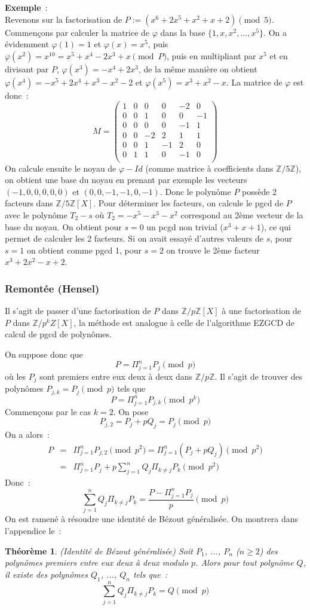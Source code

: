 \documentclass[a4paper,11pt]{article}
\newtheorem{thm}{Théorème}
\newcommand{\Z}{{\mathbb{Z}}}
\begin{document}
\begin{giacjshere}
{\bf Exemple}~:\\
Revenons sur la factorisation de $P:=(x^6+2x^5+x^2+x+2) \pmod 5$.
Commençons par calculer la matrice de $\varphi$ dans la base
$\{ 1,x,x^2,...,x^5\}$. On a évidemment $\varphi(1)=1$ et
$\varphi(x)=x^5$, puis $\varphi(x^2)=x^{10}=x^5+x^4-2x^3+x \pmod P$,
puis en multipliant par $x^5$ et en divisant par $P$,
$\varphi(x^3)=-x^4+2x^3$, de la même manière on obtient 
$\varphi(x^4)=-x^5+2x^4+x^3-x^2-2$ et $\varphi(x^5)=x^3+x^2-x$.
La matrice de $\varphi$ est donc~:
\[ M=\left( 
\begin{array}{cccccc}
1& 0& 0 &0 &-2&0\\
0& 0& 1 &0 &0 &-1\\
0& 0& 0 &0 &-1&1\\
0& 0& -2&2 & 1&1\\
0& 0& 1 &-1& 2&0\\
0& 1& 1 &0 &-1&0\\
\end{array}
\right)\]
On calcule ensuite le noyau de $\varphi-Id$ (comme matrice à coefficients
dans $\Z/5\Z$), on obtient une
base du noyau en prenant par exemple les vecteurs $(-1,0,0,0,0,0)$
et $(0,0,-1,-1,0,-1)$. Donc le polynôme $P$ possède 2 facteurs dans
$\Z/5\Z[X]$. Pour déterminer les facteurs, on calcule le pgcd de $P$
avec le polynôme $T_2-s$ où $T_2=-x^5-x^3-x^2$ correspond au 2ème
vecteur de la base du noyau. On obtient pour $s=0$ un pcgd non trivial
($x^3+x+1$), ce qui permet de calculer les 2 facteurs. Si on avait
essayé d'autres valeurs de $s$, pour $s=1$ on obtient comme pgcd 1, pour
$s=2$ on trouve le 2ème facteur $x^3+2x^2-x+2$.

\subsubsection{Remontée (Hensel)} 
Il s'agit de passer d'une factorisation de $P$ dans $\Z/p\Z[X]$ à une
factorisation de $P$ dans $\Z/p^k Z[X]$, la méthode est analogue à celle
de l'algorithme EZGCD de calcul de pgcd de polynômes.

On suppose donc que
\[ P=\Pi_{j=1}^n P_j \pmod p \]
où les $P_j$ sont premiers entre eux deux à deux dans $\Z/p\Z$.
Il s'agit de trouver des polynômes $P_{j,k}=P_j \pmod p$ tels que
\[ P=\Pi_{j=1}^n P_{j,k} \pmod {p^k} \]
Commençons par le cas $k=2$. On pose
\[ P_{j,2}=P_j+pQ_j=P_j \pmod p \]
On a alors~:
\begin{eqnarray*}
 P&=&\Pi_{j=1}^n P_{j,2} \pmod {p^2} =\Pi_{j=1}^n (P_j+pQ_j) \pmod {p^2}\\
&=&\Pi_{j=1}^n P_j + p \sum_{j=1}^n Q_j \Pi_{k\neq j} P_k \pmod {p^2} 
\end{eqnarray*}
Donc~:
\[ \sum_{j=1}^n Q_j \Pi_{k\neq j} P_k= \frac{P-\Pi_{j=1}^n P_j}{p} \pmod p \]
On est ramené à résoudre une identité de Bézout généralisée.
On montrera dans l'appendice le~:
\begin{thm} (Identité de Bézout généralisée)
Soit $P_1$, ..., $P_n$ ($n\geq 2$) des polynômes premiers entre eux deux 
à deux modulo $p$. Alors pour tout polynôme $Q$, il existe des polynômes 
$Q_1$, ..., $Q_n$ tels que~:
\[ \sum_{j=1}^n Q_j \Pi_{k\neq j} P_k=Q \pmod p \]
\end{thm}



\end{giacjshere}
\end{document}

